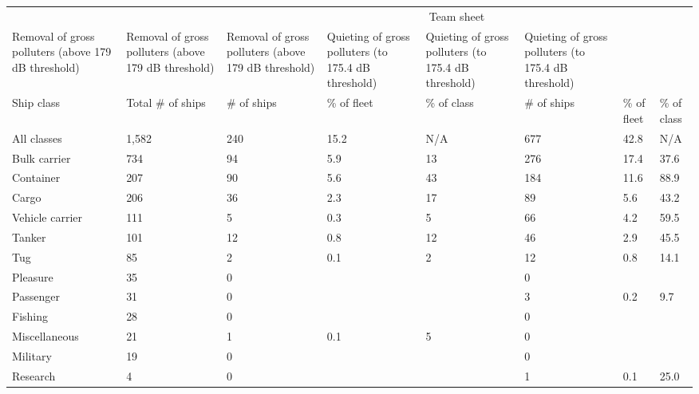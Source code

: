 
\begin{longtable}[]{@{}llllllll@{}}
\toprule
& & \multicolumn{23}{|c|}{Team sheet} \\Removal of gross polluters (above 179 dB threshold) & Removal of
gross polluters (above 179 dB threshold) & Removal of gross polluters
(above 179 dB threshold) & Quieting of gross polluters (to 175.4 dB
threshold) & Quieting of gross polluters (to 175.4 dB threshold) &
Quieting of gross polluters (to 175.4 dB threshold)\tabularnewline
\midrule
\endhead
Ship class & Total \# of ships & \# of ships & \% of fleet & \% of class
& \# of ships & \% of fleet & \% of class\tabularnewline
All classes & 1,582 & 240 & 15.2 & N/A & 677 & 42.8 & N/A\tabularnewline
Bulk carrier & 734 & 94 & 5.9 & 13 & 276 & 17.4 & 37.6\tabularnewline
Container & 207 & 90 & 5.6 & 43 & 184 & 11.6 & 88.9\tabularnewline
Cargo & 206 & 36 & 2.3 & 17 & 89 & 5.6 & 43.2\tabularnewline
Vehicle carrier & 111 & 5 & 0.3 & 5 & 66 & 4.2 & 59.5\tabularnewline
Tanker & 101 & 12 & 0.8 & 12 & 46 & 2.9 & 45.5\tabularnewline
Tug & 85 & 2 & 0.1 & 2 & 12 & 0.8 & 14.1\tabularnewline
Pleasure & 35 & 0 & & & 0 & &\tabularnewline
Passenger & 31 & 0 & & & 3 & 0.2 & 9.7\tabularnewline
Fishing & 28 & 0 & & & 0 & &\tabularnewline
Miscellaneous & 21 & 1 & 0.1 & 5 & 0 & &\tabularnewline
Military & 19 & 0 & & & 0 & &\tabularnewline
Research & 4 & 0 & & & 1 & 0.1 & 25.0\tabularnewline
\bottomrule
\end{longtable}